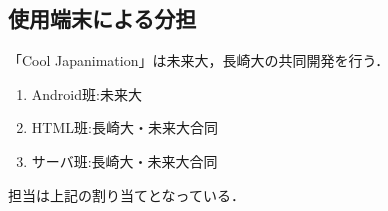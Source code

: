 \subsection{使用端末による分担}
\par
「Cool Japanimation」は未来大，長崎大の共同開発を行う．
\begin{enumerate}
\item Android班:未来大
\item HTML班:長崎大・未来大合同
\item サーバ班:長崎大・未来大合同
\end{enumerate}
\par
担当は上記の割り当てとなっている．
